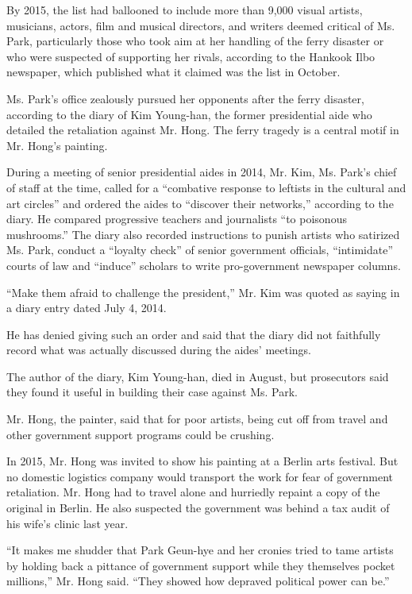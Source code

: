 By 2015, the list had ballooned to include more than 9,000 visual
artists, musicians, actors, film and musical directors, and writers
deemed critical of Ms. Park, particularly those who took aim at her
handling of the ferry disaster or who were suspected of supporting her
rivals, according to the Hankook Ilbo newspaper, which published what it
claimed was the list in October.

Ms. Park's office zealously pursued her opponents after the ferry
disaster, according to the diary of Kim Young-han, the former
presidential aide who detailed the retaliation against Mr. Hong. The
ferry tragedy is a central motif in Mr. Hong's painting.

During a meeting of senior presidential aides in 2014, Mr. Kim, Ms.
Park's chief of staff at the time, called for a ``combative response to
leftists in the cultural and art circles'' and ordered the aides to
``discover their networks,'' according to the diary. He compared
progressive teachers and journalists ``to poisonous mushrooms.'' The
diary also recorded instructions to punish artists who satirized Ms.
Park, conduct a ``loyalty check'' of senior government officials,
``intimidate'' courts of law and ``induce'' scholars to write
pro-government newspaper columns.

``Make them afraid to challenge the president,'' Mr. Kim was quoted as
saying in a diary entry dated July 4, 2014.

He has denied giving such an order and said that the diary did not
faithfully record what was actually discussed during the aides'
meetings.

The author of the diary, Kim Young-han, died in August, but prosecutors
said they found it useful in building their case against Ms. Park.

Mr. Hong, the painter, said that for poor artists, being cut off from
travel and other government support programs could be crushing.

In 2015, Mr. Hong was invited to show his painting at a Berlin arts
festival. But no domestic logistics company would transport the work for
fear of government retaliation. Mr. Hong had to travel alone and
hurriedly repaint a copy of the original in Berlin. He also suspected
the government was behind a tax audit of his wife's clinic last year.

``It makes me shudder that Park Geun-hye and her cronies tried to tame
artists by holding back a pittance of government support while they
themselves pocket millions,'' Mr. Hong said. ``They showed how depraved
political power can be.''

